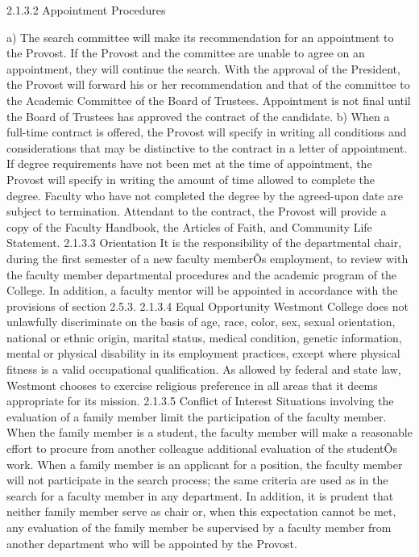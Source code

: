 \documentclass[letterpaper, 11pt]{article}
\begin{document}
2.1.3.2 Appointment Procedures

a) The search committee will make its recommendation for an appointment to the Provost.  If the Provost and the committee are unable to agree on an appointment, they will continue the search.  With the approval of the President, the Provost will forward his or her recommendation and that of the committee to the Academic Committee of the Board of Trustees.  Appointment is not final until the Board of Trustees has approved the contract of the candidate.
b) When a full-time contract is offered, the Provost will specify in writing all conditions and considerations that may be distinctive to the contract in a letter of appointment.  If degree requirements have not been met at the time of appointment, the Provost will specify in writing the amount of time allowed to complete the degree.  Faculty who have not completed the degree by the agreed-upon date are subject to termination.  Attendant to the contract, the Provost will provide a copy of the Faculty Handbook, the Articles of Faith, and Community Life Statement.
2.1.3.3 Orientation
   It is the responsibility of the departmental chair, during the first semester of a new faculty memberÕs employment, to review with the faculty member departmental procedures and the academic program of the College.  In addition, a faculty mentor will be appointed in accordance with the provisions of section 2.5.3.  
2.1.3.4 Equal Opportunity
   Westmont College does not unlawfully discriminate on the basis of age, race, color, sex, sexual orientation, national or ethnic origin, marital status, medical condition, genetic information, mental or physical disability in its employment practices, except where physical fitness is a valid occupational qualification. As allowed by federal and state law, Westmont chooses to exercise religious preference in all areas that it deems appropriate for its mission.
2.1.3.5 Conflict of Interest
   Situations involving the evaluation of a family member limit the participation of the faculty member.  When the family member is a student, the faculty member will make a reasonable effort to procure from another colleague additional evaluation of the studentÕs work.  When a family member is an applicant for a position, the faculty member will not participate in the search process; the same criteria are used as in the search for a faculty member in any department.  In addition, it is prudent that neither family member serve as chair or, when this expectation cannot be met, any evaluation of the family member be supervised by a faculty member from another department who will be appointed by the Provost.
\end{document}
